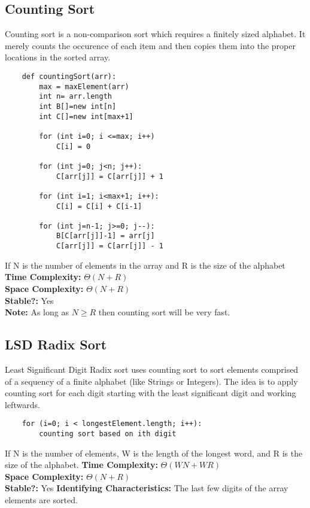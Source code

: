 \documentclass{article}
\begin{document}
\subsection{Counting Sort}
Counting sort is a non-comparison sort which requires a finitely sized alphabet.
It merely counts the occurence of each item and then copies them into the proper locations in the sorted array.
\begin{lstlisting}
    def countingSort(arr):
        max = maxElement(arr)
        int n= arr.length
        int B[]=new int[n]
        int C[]=new int[max+1]

        for (int i=0; i <=max; i++)
            C[i] = 0

        for (int j=0; j<n; j++):
            C[arr[j]] = C[arr[j]] + 1
    
        for (int i=1; i<max+1; i++):
            C[i] = C[i] + C[i-1]

        for (int j=n-1; j>=0; j--):
            B[C[arr[j]]-1] = arr[j]
            C[arr[j]] = C[arr[j]] - 1
\end{lstlisting}
If N is the number of elements in the array and R is the size of the alphabet
\textbf{Time Complexity: } $\Theta(N + R)$\\
\textbf{Space Complexity: } $\Theta(N + R)$\\
\textbf{Stable?: } Yes\\
\textbf{Note: } As long as $N \ge R$ then counting sort will be very fast.
\subsection{LSD Radix Sort}
Least Significant Digit Radix sort uses counting sort to sort elements comprised of a sequency of a finite alphabet (like Strings or Integers).
The idea is to apply counting sort for each digit starting with the least significant digit and working leftwards.
\begin{lstlisting}
    for (i=0; i < longestElement.length; i++):
        counting sort based on ith digit
\end{lstlisting}
If N is the number of elements, W is the length of the longest word, and R is the size of the alphabet.
\textbf{Time Complexity: } $\Theta(WN + WR)$\\
\textbf{Space Complexity: } $\Theta(N + R)$\\
\textbf{Stable?: } Yes
\textbf{Identifying Characteristics: } The last few digits of the array elements are sorted.
\end{document}
